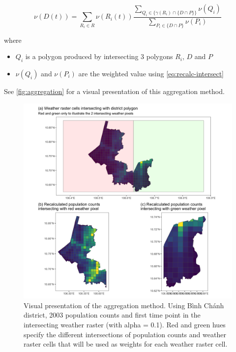 \documentclass{article}
\begin{document}
\begin{equation*}
    \nu(D(t)) = \sum_{R_i \in R}{ \nu(R_i(t))
            \frac
            { \sum_{Q_i \in \{\gamma(R_i) \cap \{D \cap P\}\}} \nu(Q_i)}
            { \sum_{P_i \in \{D \cap P\}} \nu(P_i)}
        }
\end{equation*}


where

\begin{itemize}
    \item $Q_i$ is a polygon produced by intersecting 3 polygons $R_i$, $D$ and $P$
    \item $\nu(Q_i)$ and $\nu(P_i)$ are the weighted value using \autoref{eq:recalc-intersect}
\end{itemize}

See \autoref{fig:aggregation} for a visual presentation of this aggregation method.

\begin{figure}
    \centering
    \includegraphics[width=1\linewidth]{aggregation.png}
    \caption{Visual presentation of the aggregation method. Using Bình Chánh district, 2003 population counts and first time point in the intersecting weather raster (with alpha = 0.1). Red and green hues specify the different intersections of population counts and weather raster cells that will be used as weights for each weather raster cell.}
    \label{fig:aggregation}
\end{figure}
\end{document}
